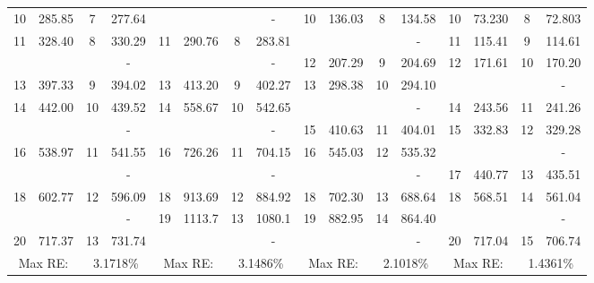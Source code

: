 \begin{table}[h!]
{{\begin{tabular}{|cccc||cccc||cccc||cccc|}
			{10} & 285.85 & 7     & 277.64 & \cellcolor{lightgray}{10}    & \cellcolor{lightgray}{192.03} &      & {-} & 10    & 136.03 & 8     & 134.58 & 10    & 73.230 & 8     & 72.803 \\
			{11} & 328.40 & 8     & 330.29 & 11    & 290.76 & 8     & 283.81 & \cellcolor{lightgray}{11}    & \cellcolor{lightgray}{192.48} &       & {-} & 11    & 115.41 & 9     & 114.61 \\
			\cellcolor{lightgray}{12} & \cellcolor{lightgray}{357.08} &       & {-} & \cellcolor{lightgray}{12}    & \cellcolor{lightgray}{374.45} &       & {-} & 12    & 207.29 & 9     & 204.69 & 12    & 171.61 & 10    & 170.20 \\
			{13} & 397.33 & 9     & 394.02 & 13    & 413.20 & 9     & 402.27 & 13    & 298.38 & 10    & 294.10 & \cellcolor{lightgray}{13}    & \cellcolor{lightgray}{192.52} &       & {-} \\
			{14} & 442.00   & 10    & 439.52 & 14    & 558.67 & 10    & 542.65 & \cellcolor{lightgray}{14}    & \cellcolor{lightgray}{376.83} &       & {-} & 14    & 243.56 & 11    & 241.26 \\
			\cellcolor{lightgray}{15} & \cellcolor{lightgray}{533.71} &       & {-} & \cellcolor{lightgray}{15}    & \cellcolor{lightgray}{614.11} &       & {-} & 15    & 410.63 & 11    & 404.01 & 15    & 332.83 & 12    & 329.28 \\
			{16} & 538.97 & 11    & 541.55 & 16    & 726.26 & 11    & 704.15 & 16    & 545.03 & 12    & 535.32 & \cellcolor{lightgray}{16}    & \cellcolor{lightgray}{377.16} &       & {-} \\
			\cellcolor{lightgray}{17} & \cellcolor{lightgray}{596.06} &       & {-} & \cellcolor{lightgray}{17}    & \cellcolor{lightgray}{906.28} &       & {-} & \cellcolor{lightgray}{17}    & \cellcolor{lightgray}{621.95} &       & {-} & 17    & 440.77 & 13    & 435.51 \\
			{18} & 602.77 & 12    & 596.09 & 18    & 913.69 & 12    & 884.92 & 18    & 702.30 & 13    & 688.64 & 18    & 568.51 & 14    & 561.04 \\
			\cellcolor{lightgray}{19} & \cellcolor{lightgray}{657.87} &       & {-} & 19    & 1113.7 & 13    & 1080.1 & 19    & 882.95 & 14    & 864.40 & \cellcolor{lightgray}{19}    & \cellcolor{lightgray}{623.05} &       & {-} \\
			{20} & 717.37 & 13    & 731.74 & \cellcolor{lightgray}{20}    & \cellcolor{lightgray}{1218.0}  &       & {-} & \cellcolor{lightgray}{20}    & \cellcolor{lightgray}{927.18} &       & {-} & 20    & 717.04 & 15    & 706.74 \\
			\hline
			\multicolumn{2}{|c}{Max RE:} & \multicolumn{2}{c||}{3.1718\%} & \multicolumn{2}{c}{Max RE:} & \multicolumn{2}{c||}{3.1486\%} & \multicolumn{2}{c}{Max RE:} & \multicolumn{2}{c||}{2.1018\%} & \multicolumn{2}{c}{Max RE:} & \multicolumn{2}{c|}{1.4361\%} \\
			\hline
		\end{tabular}%
		\label{tab:Timo}%
	}
	}
	\end{table}%
	\FloatBarrier

